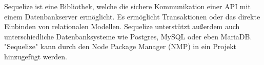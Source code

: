 
Sequelize ist eine Bibliothek, welche die sichere Kommunikation einer API mit einem Datenbankserver ermöglicht. Es ermöglicht Transaktionen oder das direkte Einbinden von relationalen Modellen. Sequelize unterstützt außerdem auch unterschiedliche Datenbanksysteme wie Postgres, MySQL oder eben MariaDB. "Sequelize" kann durch den Node Package Manager (NMP) in ein Projekt hinzugefügt werden. \cite{Sequelize} \cite{SequInstall}